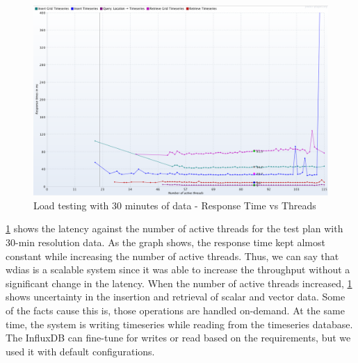 \begin{figure}[htp]
    \centering
    \includegraphics[width=1.0\textwidth]{results/obs/all/obs_all_30m_response_times_vs_threads.png}
    \caption{Load testing with 30 minutes of data - Response Time vs Threads}
    \label{fi:test_obs_all_30m_response_vs_threads}
\end{figure}

\cref{fi:test_obs_all_30m_response_vs_threads} shows the latency against the number of active threads for the test plan with 30-min resolution data. As the graph shows, the response time kept almost constant while increasing the number of active threads. Thus, we can say that \acrshort{wdias} is a scalable system since it was able to increase the throughput without a significant change in the latency. When the number of active threads increased, \cref{fi:test_obs_all_30m_response_vs_threads} shows uncertainty in the insertion and retrieval of scalar and vector data. Some of the facts cause this is, those operations are handled on-demand. At the same time, the system is writing timeseries while reading from the timeseries database. The InfluxDB can fine-tune for writes or read based on the requirements, but we used it with default configurations.


